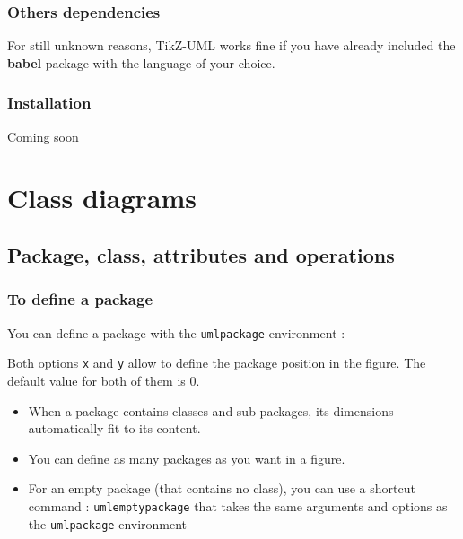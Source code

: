 \documentclass[a4paper,11pt]{report}
\newcommand{\inputTikZ}[1]{%
  }%
\newcommand{\inputTikZ}[1]{%
    \texttt{[image: fig/\#1.pdf]}%
  }%
\newcommand{\tuml}{{\sc TikZ-UML} \xspace}
\begin{document}
\subsection*{Others dependencies}

For still unknown reasons, \tuml works fine if you have already included the {\bf babel} package with the language of your choice.

\subsection*{Installation}

Coming soon

\chapter{Class diagrams}\label{c.class}

\section{Package, class, attributes and operations}\label{s.packageclass}

\subsection{To define a package}\label{ss.package}

You can define a package with the {\tt umlpackage} environment :

\medskip

\begin{minipage}{0.5\textwidth}

\end{minipage}
\begin{minipage}{0.4\textwidth}
\begin{center}
\inputTikZ{package}
\end{center}
\end{minipage}

\medskip

Both options {\tt x} and {\tt y} allow to define the package position in the figure. 
The default value for both of them is 0.

\begin{itemize}
\item When a package contains classes and sub-packages, its dimensions automatically fit to its content.
\item You can define as many packages as you want in a figure.
\item For an empty package (that contains no class), you can use a shortcut command : {\tt umlemptypackage} that takes the same arguments and options as the {\tt umlpackage} environment
\end{itemize}
\end{document}
